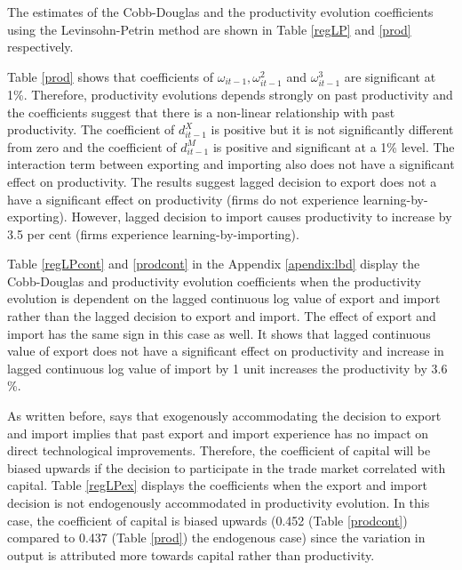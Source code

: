 \documentclass[12pt]{article}
\begin{document}
The estimates of the Cobb-Douglas and  the productivity evolution
coefficients  using the Levinsohn-Petrin
method are shown in Table \ref{regLP} and \ref{prod}  respectively. 

Table \ref{prod} shows that coefficients of $\omega_{it-1},
\omega_{it-1}^{2}$ and $\omega_{it-1}^{3}$ are significant at 1\%. Therefore, productivity evolutions depends strongly
on past productivity and the coefficients suggest that there is a
non-linear relationship with past
productivity. The coefficient of $d_{it-1}^{X}$ is positive but it is
not significantly different from zero and the coefficient of
$d_{it-1}^{M}$  is positive and significant at a 1\% level. The
interaction term between exporting and importing also does not have a significant effect on productivity.
The results suggest lagged decision to export does not a have
a significant effect on productivity (firms do not experience learning-by-exporting). However, 
lagged decision to import causes productivity to increase by 3.5  per
cent (firms experience learning-by-importing).  

 


Table \ref{regLPcont} and \ref{prodcont} in the Appendix \ref{apendix:lbd} display the Cobb-Douglas and
productivity evolution
coefficients  when the
productivity evolution is dependent on the lagged continuous log value of export
and import rather than the lagged decision to export and import.
The effect of export and import has the same sign in this case as
well. It shows that lagged
continuous value of export does not have a significant effect on
productivity and  increase in lagged continuous log value of import  by 1 unit
increases the productivity by 3.6 \%.  


As written before, \textcite{de2013detecting} says that exogenously accommodating the
decision to export and import implies that
past export and import experience has no impact on direct technological
improvements. Therefore, the coefficient of capital will be biased
upwards if the decision to participate in the trade market correlated with capital. Table
\ref{regLPex} displays the coefficients when the export and import
decision is not endogenously accommodated in 
productivity evolution. In this case, the coefficient of capital is
biased upwards (0.452 (Table \ref{prodcont}) compared to 0.437 (Table \ref{prod}) the endogenous case)  since
the variation in output is attributed more towards capital rather than productivity.   

\end{document}

